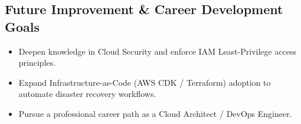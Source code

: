 \documentclass[a4paper]{article}
\begin{document}
\subsection{Future Improvement \& Career Development Goals}
\begin{itemize}
    \item Deepen knowledge in Cloud Security and enforce IAM Least-Privilege access principles.
    \item Expand Infrastructure-as-Code (AWS CDK / Terraform) adoption to automate disaster recovery workflows.
    \item Pursue a professional career path as a Cloud Architect / DevOps Engineer.
\end{itemize}
\clearpage



\end{document}
